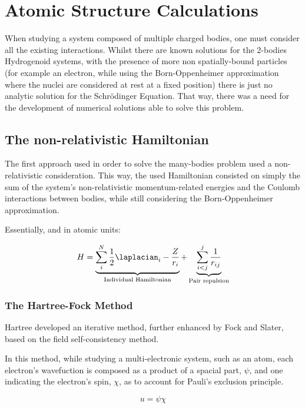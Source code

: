 \section{Atomic Structure Calculations}

When studying a system composed of multiple charged bodies, one must consider all the existing interactions. Whilst there are known solutions for the 2-bodies Hydrogenoid systems, with the presence of more non spatially-bound particles (for example an electron, while using the 
Born-Oppenheimer approximation where the nuclei are considered at rest at a fixed position) there is just no analytic solution for the Schrödinger Equation. That way, there was a need for the development of numerical solutions able to solve this problem.

\subsection{The non-relativistic Hamiltonian}

The first approach used in order to solve the many-bodies problem used a non-relativistic consideration. This way, the used Hamiltonian consisted on simply the sum of the system's non-relativistic momentum-related energies and the Coulomb interactions between bodies, while still considering the Born-Oppenheimer approximation.

Essentially, and in atomic units:

\begin{equation}
    H= \underbrace{\displaystyle\sum_i^N \dfrac{1}{2}\laplacian_i  -\frac{Z}{r_i}}_{\text{Individual Hamiltonian}} + \underbrace{\sum_{i<j}^{j}\dfrac{1}{r_{ij}}}_{\text{Pair repulsion}}
    \label{eq:nonRelHam}
\end{equation}

\subsubsection{The Hartree-Fock Method}\label{sec:HF}

Hartree developed an iterative method, further enhanced by Fock and Slater, based on the field self-consistency method.

In this method, while studying a multi-electronic system, such as an atom, each electron's wavefuction is composed as a product of a spacial part, $\psi$, and one indicating the electron's spin, $\chi$, as to account for Pauli's exclusion principle.

\begin{equation}
    u=\psi\chi
\end{equation}

